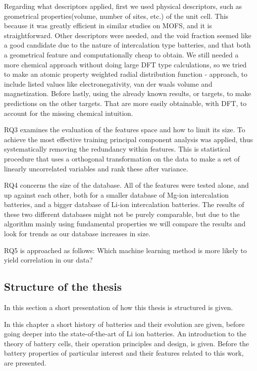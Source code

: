 Regarding what descriptors applied, first we used physical descriptors, such as geometrical properties(volume, number of sites, etc.) of the unit cell. This because it was greatly efficient in similar studies on MOFS, and it is straightforward. Other descriptors were needed, and the void fraction seemed like a good candidate due to the nature of intercalation type batteries, and that both a geometrical feature and computationally cheap to obtain. We still needed a more chemical approach without doing large DFT type calculations, so we tried to make an atomic property weighted radial distribution function - approach, to include listed values like electronegativity, van der waals volume and magnetization. Before lastly, using the already known results, or targets, to make predictions on the other targets. That are more easily obtainable, with DFT, to account for the missing chemical intuition.

RQ3 examines the evaluation of the features space and how to limit its size. To achieve the most effective training principal component analysis was applied, thus systematically removing the redundancy within features. This is statistical procedure that uses a orthogonal transformation on the data to make a set of linearly uncorrelated variables and rank these after variance. 

RQ4 concerns the size of the database. All of the features were tested alone, and up against each other, both for a smaller database of Mg-ion intercalation batteries, and a bigger database of Li-ion intercalation batteries. The results of these two different databases might not be purely comparable, but due to the algorithm mainly using fundamental properties we will compare the results and look for trends as our database increases in size. 

RQ5 is approached as follows: Which machine learning method is more likely to yield correlation in our data?

\subsection{Structure of the thesis}
In this section a short presentation of how this thesis is structured is given. 



	In this chapter a short history of batteries and their evolution are given, before going deeper into the state-of-the-art of Li ion batteries. An introduction to the theory of battery cells, their operation principles and design, is given. Before the battery properties of particular interest and their features related to this work, are presented. 

